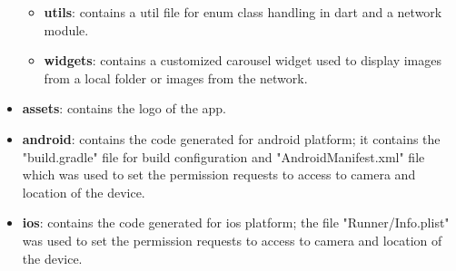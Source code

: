 \begin{itemize}
\begin{itemize}
\begin{itemize}[label=]
		\end{itemize}
		\item \textbf{utils}: contains a util file for enum class handling in dart and a network module.
		\item \textbf{widgets}: contains a customized carousel widget used to display images from a local folder or images from the network.
	\end{itemize}
	\item \textbf{assets}: contains the logo of the app.
	\item \textbf{android}: contains the code generated for android platform; it contains the "build.gradle" file for build configuration and "AndroidManifest.xml" file which was used to set the permission requests to access to camera and location of the device.
	\item \textbf{ios}: contains the code generated for ios platform; the file "Runner/Info.plist" was used to set the permission requests to access to camera and location of the device.
\end{itemize}